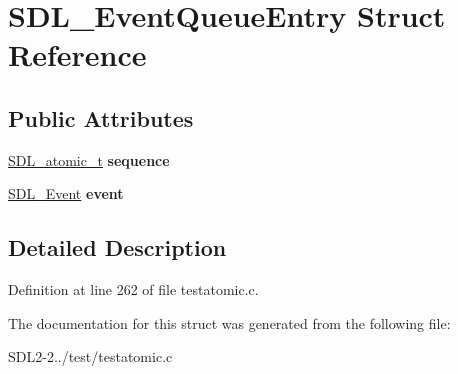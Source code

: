 \hypertarget{structSDL__EventQueueEntry}{\section{S\+D\+L\+\_\+\+Event\+Queue\+Entry Struct Reference}
\label{structSDL__EventQueueEntry}
}
\subsection*{Public Attributes}
\begin{DoxyCompactItemize}
\item 
\hypertarget{structSDL__EventQueueEntry_a7513895d59f2b466047fd343bdad6270}{\hyperlink{structSDL__atomic__t}{S\+D\+L\+\_\+atomic\+\_\+t} {\bfseries sequence}}\label{structSDL__EventQueueEntry_a7513895d59f2b466047fd343bdad6270}

\item 
\hypertarget{structSDL__EventQueueEntry_ab8716507265b8fc389a3de478690410d}{\hyperlink{unionSDL__Event}{S\+D\+L\+\_\+\+Event} {\bfseries event}}\label{structSDL__EventQueueEntry_ab8716507265b8fc389a3de478690410d}

\end{DoxyCompactItemize}


\subsection{Detailed Description}


Definition at line 262 of file testatomic.\+c.



The documentation for this struct was generated from the following file\+:\begin{DoxyCompactItemize}
\item 
S\+D\+L2-\/2../test/testatomic.\+c\end{DoxyCompactItemize}
